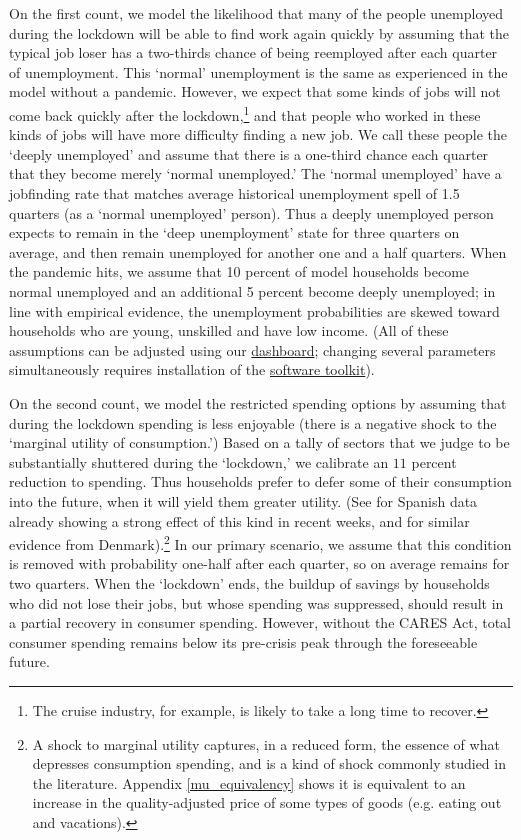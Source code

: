 \documentclass[titlepage,a4paper]{\econtex}
\begin{document}
On the first count, we model the likelihood that many of the people unemployed during the lockdown will be able to find work again quickly by assuming that the typical job loser has a two-thirds chance of being reemployed after each quarter of unemployment. This `normal' unemployment is the same as experienced in the model without a pandemic.  However, we expect that some kinds of jobs will not come back quickly after the lockdown,\footnote{The cruise industry, for example, is likely to take a long time to recover.} and that people who worked in these kinds of jobs will have more difficulty finding a new job.  We call these people the `deeply unemployed' and assume that there is a one-third chance each quarter that they become merely `normal unemployed.'  The `normal unemployed' have a jobfinding rate that matches average historical unemployment spell of 1.5 quarters (as a `normal unemployed' person).  Thus a deeply unemployed person expects to remain in the `deep unemployment' state for three quarters on average, and then remain unemployed for another one and a half quarters.  When the pandemic hits, we assume that 10 percent of model households become normal unemployed and an additional 5 percent become deeply unemployed; in line with empirical evidence, the unemployment probabilities are skewed toward households who are young, unskilled and have low income.  (All of these assumptions can be adjusted using our \href{http://econ-ark.org/pandemicdashboard}{dashboard}; changing several parameters simultaneously requires installation of the \href{https://github.com/econ-ark/Pandemic}{software toolkit}).

On the second count, we model the restricted spending options by assuming that during the lockdown spending is less enjoyable (there is a negative shock to the `marginal utility of consumption.')
Based on a tally of sectors that we judge to be substantially shuttered during the `lockdown,' we calibrate an $11$ percent reduction to spending.
Thus households prefer to defer some of their consumption into the future, when it will yield them greater utility. (See \cite{SpanishSpending} for Spanish data already showing a strong effect of this kind in recent weeks, and \cite{denmark_pandemics} for similar evidence from Denmark).\footnote{A shock to marginal utility captures, in a reduced form, the essence of what depresses consumption spending, and is a kind of shock commonly studied in the literature.  Appendix \ref{mu_equivalency} shows it is equivalent to an increase in the quality-adjusted price of some types of goods (e.g. eating out and vacations).}
In our primary scenario, we assume that this condition is removed with probability one-half after each quarter, so on average remains for two quarters.  When the `lockdown' ends, the buildup of savings by households who did not lose their jobs, but whose spending was suppressed, should result in a partial recovery in consumer spending. However, without the CARES Act, total consumer spending remains below its pre-crisis peak through the foreseeable future.
\end{document}
